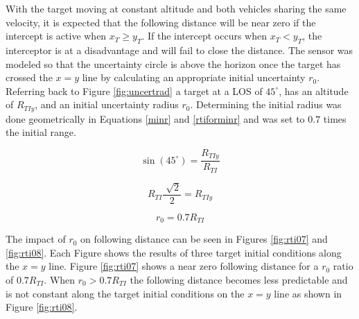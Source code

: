 \documentclass[conference]{IEEEtran}
\begin{document}

With the target moving at constant altitude and both vehicles sharing the same velocity, it is expected that the following distance will be near zero if the intercept is active when $x_T \geq y_T$. If the intercept occurs when $x_T<y_T$, the interceptor is at a disadvantage and will fail to close the distance. The sensor was modeled so that the uncertainty circle is above the horizon once the target has crossed the $x=y$ line by calculating an appropriate initial uncertainty $r_0$. Referring back to Figure \ref{fig:uncertrad} a target at a LOS of $45^{\circ}$, has an altitude of $R_{TIy}$, and an initial uncertainty radius $r_0$. Determining the initial radius was done geometrically in Equations \ref{minr} and \ref{rtiforminr} and was set to $0.7$ times the initial range.

\begin{equation} \label{minr}
\sin(45^\circ) = \frac{R_{TIy}}{R_{TI}}
\end{equation}

\begin{equation} \label{rtiforminr}
R_{TI}\frac{\sqrt[]{2}}{2} = R_{TIy}
\end{equation}

\begin{equation} \label{initialr}
r_0 = 0.7R_{TI}
\end{equation}

The impact of $r_0$ on following distance can be seen in Figures \ref{fig:rti07} and \ref{fig:rti08}.
 Each Figure shows the results of three target initial conditions along the $x=y$ line. Figure \ref{fig:rti07} shows a near zero following distance for a $r_0$ ratio of $0.7R_{TI}$. When $r_0>0.7R_{TI}$ the following distance becomes less predictable and is not constant along the target initial conditions on the $x=y$ line as shown in Figure \ref{fig:rti08}.
 
\end{document}

